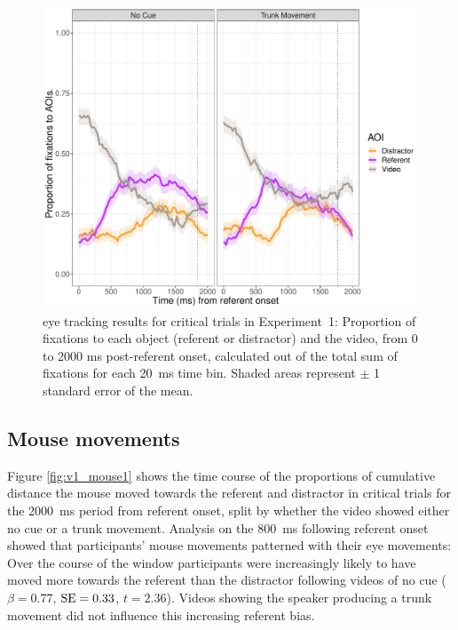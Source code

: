 \documentclass[a4paper,man,natbib]{apa6}
\newcommand{\resultsLM}[3]{$\beta = #1$, $\textnormal{SE} = #2$, $t #3$}
\begin{document}
\begin{figure}[Ht]
  \centering
	\includegraphics[width=\linewidth]{./img/e7_fixations_crit.pdf}
  \caption{eye tracking results for critical trials in Experiment~1: Proportion of fixations to each object (referent or distractor) and the video, from 0 to 2000 ms post-referent onset, calculated out of the total sum of fixations for each 20~ms time bin. Shaded areas represent $\pm$ 1 standard error of the mean.}
  \label{fig:v1_eye1}
\end{figure}

\subsection{Mouse movements}
Figure \ref{fig:v1_mouse1} shows the time course of the proportions of cumulative distance the mouse moved towards the referent and distractor in critical trials for the 2000~ms period from referent onset, split by whether the video showed either no cue or a trunk movement.
Analysis on the 800~ms following referent onset showed that participants' mouse movements patterned with their eye movements:
Over the course of the window participants were increasingly likely to have moved more towards the referent than the distractor following videos of no cue (\resultsLM{0.77}{0.33}{=2.36}). 
Videos showing the speaker producing a trunk movement did not influence this increasing referent bias.
\end{document}
